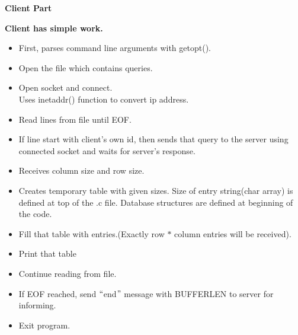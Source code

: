 \documentclass[12pt]{report}
\renewcommand{\_}{\kern-1.5pt\textunderscore\kern-1.5pt}
\begin{document}
\vspace{\baselineskip}
\begin{FlushLeft}
{\fontsize{16pt}{19.2pt}\selectfont \textbf{Client Part}}
\end{FlushLeft}
\begin{FlushLeft}
\textbf{Client has simple work.}
\end{FlushLeft}
\begin{itemize}
	\item First, parses command line arguments with getopt().
	\item Open the file which contains queries.
	\item Open socket and connect.\\
Uses inet\_addr() function to convert ip address.
	\item Read lines from file until EOF.
	\item If line start with client’s own id, then sends that query to the server using connected socket and waits for server’s response.
	\item Receives column size and row size.
	\item Creates temporary table with given sizes. Size of entry string(char array) is defined at top of the .c file. Database structures are defined at beginning of the code.
	\item Fill that table with entries.(Exactly row $\ast$  column entries will be received).
	\item Print that table
	\item Continue reading from file.
	\item If EOF reached, send $``$end$"$  message with BUFFER\_LEN to server for informing.
	\item Exit program.
\end{itemize}
\end{document}
